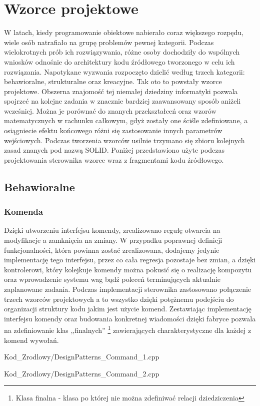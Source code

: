 \chapter{Wzorce projektowe}
W latach, kiedy programowanie obiektowe nabierało coraz większego rozpędu, wiele osób natrafiało na grupę problemów pewnej kategorii.
Podczas wielokrotnych prób ich rozwiązywania, różne osoby dochodziły do wspólnych wniosków odnośnie do architektury kodu źródłowego tworzonego w celu ich rozwiązania.
Napotykane wyzwania rozpoczęto dzielić według trzech kategorii: behawioralne, strukturalne oraz kreacyjne. Tak oto to powstały wzorce projektowe.
Obszerna znajomość tej niemałej dziedziny informatyki pozwala spojrzeć na kolejne zadania w znacznie bardziej zaawansowany sposób aniżeli wcześniej.
Można je porównać do znanych przekształceń oraz wzorów matematycznych w rachunku całkowym, gdyż zostały one ściśle zdefiniowane, a osiągniecie efektu końcowego różni się
zastosowanie innych parametrów wejściowych. Podczas tworzenia wzorców usilnie trzymano się zbioru kolejnych zasad znanych pod nazwą SOLID. \newline
Poniżej przedstawiono użyte podczas projektowania sterownika wzorce wraz z fragmentami kodu źródłowego.
\section{Behawioralne}
    \subsection{Komenda}
        Dzięki utworzeniu interfejsu komendy, zrealizowano regułę otwarcia na modyfikacje a zamknięcia na zmiany.
        W przypadku poprawnej definicji funkcjonalności, która powinna zostać zrealizowana, dodajemy jedynie implementację tego interfejsu,
        przez co cała regresja pozostaje bez zmian, a dzięki kontrolerowi, który kolejkuje komendy można pokusić się o realizację kompozytu oraz
        wprowadzenie systemu wag bądź poleceń terminujących aktualnie zaplanowane zadania.
        Podczas implementacji sterownika zastosowano połączenie trzech wzorców projektowych a to wszystko dzięki potężnemu podejściu do organizacji
        struktury kodu jakim jest użycie komend. Zestawiając implementację interfejsu komendy oraz budowania konkretnej wiadomości dzięki fabryce
        pozwala na zdefiniowanie klas ,,finalnych''
        \footnote{\label{Klasa finalna} Klasa finalna - klasa po której nie można zdefiniwać relacji dziedziczenia} 
        zawierających charakterystyczne dla każdej z komend wywołań. 
        
            {Kod_Zrodlowy/DesignPatterns_Command_1.cpp}
        
            {Kod_Zrodlowy/DesignPatterns_Command_2.cpp}
    \newpage

